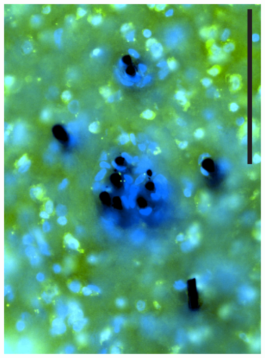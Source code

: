 \documentclass{beamer}
\begin{document}
\begin{frame}
  \begin{center}
  \includegraphics[height=0.9\textheight]{CFHistSplayFronSanneImg1}

\end{center}
\end{frame}
\end{document}
